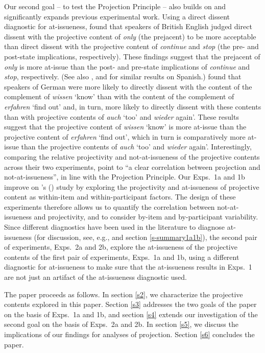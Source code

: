 \documentclass[11pt,fleqn]{article}
\newcommand{\6}{\mbox{$[\hspace*{-.6mm}[$}}
\newcommand{\9}{\mbox{$]\hspace*{-.6mm}]$}}
\newcommand{\citetpos}[1]{\citeauthor{#1}'s (\citeyear{#1})}
\begin{document}
Our second goal -- to test the Projection Principle -- also builds on and significantly expands previous experimental work. 
 Using a direct dissent diagnostic for at-issueness, \citet{amaral-etal11} found that speakers of British English judged direct dissent with the projective content of {\em only} (the prejacent) to be more acceptable than direct dissent with the projective content of {\em continue} and {\em stop} (the pre- and post-state implications, respectively). These findings suggest that the prejacent of {\em only} is more at-issue than the post- and pre-state implications of {\em continue} and {\em stop}, respectively. (See also \citealt{cummins-etal2012}, and \citealt{amaral-cummins2015} for similar results on Spanish.) \citet{xue-onea11} found that speakers of German were more likely to directly dissent with the content of the complement of {\em wissen} `know' than with the content of the complement of {\em erfahren} `find out' and, in turn, more likely to directly dissent with these contents than with projective contents of {\em auch} `too' and {\em wieder} again'. These results suggest that the projective content of {\em wissen} `know' is more at-issue than the projective content of {\em erfahren} `find out', which in turn is comparatively more at-issue than the projective contents of {\em auch} `too' and {\em wieder} again'. Interestingly, comparing the relative projectivity and not-at-issueness 
of the projective contents across their two experiments, \citet[180]{xue-onea11} point to ``a clear correlation between projection and not-at-issueness'', in line with the Projection Principle. Our Exps.~1a and 1b improve on \citetpos{xue-onea11} study by exploring the projectivity and at-issueness of projective content as within-item and within-participant factors. The design of these experiments therefore allows us to quantify the correlation between not-at-issueness and projectivity, and to consider by-item and by-participant variability. Since different diagnostics have been used in the literature to diagnose at-issueness (for discussion, see, e.g., \citealt{tonhauser-sula6} and section \ref{s-summary1a1b}), the second pair of experiments, Exps.~2a and 2b, explore the at-issueness of the projective contents of the first pair of experiments, Exps.~1a and 1b, using a different diagnostic for at-issueness to make sure that the at-issueness results in Exps.~1 are not just an artifact of the at-issueness diagnostic used.

The paper proceeds as follows. In section \ref{s2}, we characterize the projective contents explored in this paper. Section \ref{s3} addresses the two goals of the paper on the basis of Exps.~1a and 1b, and section \ref{s4} extends our investigation of the second goal on the basis of Exps.~2a and 2b. In section \ref{s5}, we discuss the implications of our findings for analyses of projection. Section \ref{s6} concludes the paper.
\end{document}
